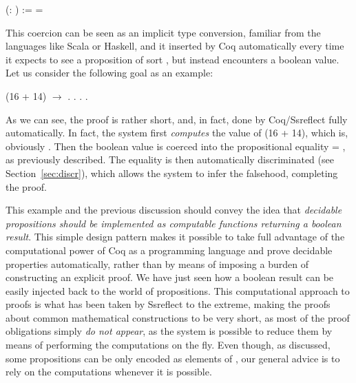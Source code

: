 \coqdoceol
\coqdocemptyline
\coqdocnoindent
{}  (: ) :=  = 

\coqdocemptyline


This coercion can be seen as an implicit type conversion, familiar
from the languages like Scala or Haskell, 
and it inserted by Coq automatically
every time it expects to see a proposition of sort , but instead
encounters a boolean value. Let us consider the following goal as an
example:


\begin{coqdoccode}
\coqdocemptyline
\coqdocnoindent
{}  (16 + 14) \ensuremath{\rightarrow} .\coqdoceol
\coqdocnoindent
{}. . .\coqdoceol
\coqdocemptyline
\end{coqdoccode}


As we can see, the proof is rather short, and, in fact, done by
Coq/Ssreflect fully automatically. In fact, the system first
\textit{computes} the value of  (16 + 14), which is, obviously
. Then the boolean value  is coerced into the
propositional equality  = , as previously described. The
equality is then automatically discriminated (see
Section~\ref{sec:discr}), which allows the system to infer the
falsehood, completing the proof.


This example and the previous discussion should convey the idea that
\textit{decidable propositions should be implemented as computable functions
returning a boolean result}. This simple design pattern makes it
possible to take full advantage of the computational power of Coq as a
programming language and prove decidable properties automatically,
rather than by means of imposing a burden of constructing an explicit
proof. We have just seen how a boolean result can be easily injected
back to the world of propositions. This computational approach to
proofs is what has been taken by Ssreflect to the extreme, making the
proofs about common mathematical constructions to be very short, as
most of the proof obligations simply \textit{do not appear}, as the system is
possible to reduce them by means of performing the computations on the
fly. Even though, as discussed, some propositions can be only encoded
as elements of , our general advice is to rely on the
computations whenever it is possible.


